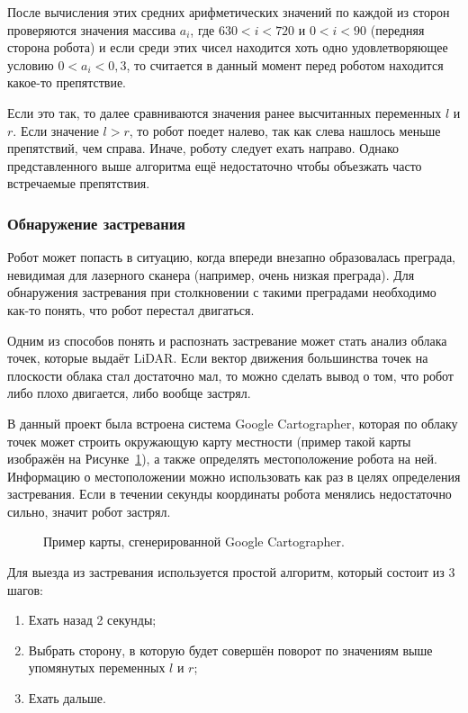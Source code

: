 После вычисления этих средних арифметических значений по каждой из сторон проверяются значения массива $a_i$, где $630 < i < 720$ и $0 < i < 90$ (передняя сторона робота) и если среди этих чисел находится хоть одно удовлетворяющее условию $0 < a_i < 0,3$, то считается в данный момент перед роботом находится какое-то препятствие.

Если это так, то далее сравниваются значения ранее высчитанных переменных $l$ и $r$. Если значение $l > r$, то робот поедет налево, так как слева нашлось меньше препятствий, чем справа. Иначе, роботу следует ехать направо. Однако представленного выше алгоритма ещё недостаточно чтобы объезжать часто встречаемые препятствия. 

\subsubsection{Обнаружение застревания}

Робот может попасть в ситуацию, когда впереди внезапно образовалась преграда, невидимая для лазерного сканера (например, очень низкая преграда). Для обнаружения застревания при столкновении с такими преградами необходимо как-то понять, что робот перестал двигаться. 

Одним из способов понять и распознать застревание может стать анализ облака точек, которые выдаёт LiDAR. Если вектор движения большинства точек на плоскости облака стал достаточно мал, то можно сделать вывод о том, что робот либо плохо двигается, либо вообще застрял. 

В данный проект была встроена система Google Cartographer, которая по облаку точек может строить окружающую карту местности (пример такой карты изображён на Рисунке~\ref{fig:cartographer-example}), а также определять местоположение робота на ней\cite[с. 1]{45466}. Информацию о местоположении можно использовать как раз в целях определения застревания. Если в течении секунды координаты робота менялись недостаточно сильно, значит робот застрял.

\begin{figure}[ht]
  \caption{Пример карты, сгенерированной Google Cartographer.}\label{fig:cartographer-example}
\end{figure}

Для выезда из застревания используется простой алгоритм, который состоит из 3 шагов:

\begin{enumerate}
\item Ехать назад 2 секунды;
\item Выбрать сторону, в которую будет совершён поворот по значениям выше упомянутых переменных $l$ и $r$;
\item Ехать дальше.
\end{enumerate}

